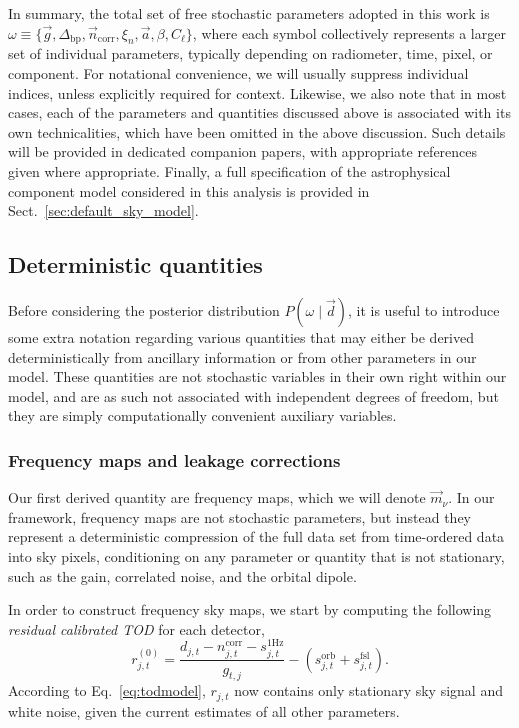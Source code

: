 \documentclass[onecolumn]{aa}
\renewcommand{\d}[0]{\vec{d}}
\newcommand{\n}[0]{\vec{n}}
\renewcommand{\a}[0]{\vec{a}}
\newcommand{\m}[0]{\vec{m}}
\newcommand{\g}[0]{\vec{g}}
\newcommand{\Dbp}[0]{\Delta_{\mathrm{bp}}}
\begin{document}
In summary, the total set of free stochastic parameters adopted in
this work is
$\omega\equiv\{\g,\Dbp,\n_{\mathrm{corr}},\xi_{n},\a,\beta,C_{\ell}\}$,
where each symbol collectively represents a larger set of individual
parameters, typically depending on radiometer, time, pixel, or
component. For notational convenience, we will usually suppress
individual indices, unless explicitly required for context. Likewise,
we also note that in most cases, each of the parameters and quantities
discussed above is associated with its own technicalities, which have
been omitted in the above discussion. Such details will be provided in
dedicated companion papers, with appropriate references given where
appropriate. Finally, a full specification of the astrophysical
component model considered in this analysis is provided in
Sect.~\ref{sec:default_sky_model}.

\subsection{Deterministic quantities}
\label{sec:derquant}

Before considering the posterior distribution $P(\omega\mid \d)$, it is
useful to introduce some extra notation regarding various quantities
that may either be derived deterministically from ancillary
information or from other parameters in our model. These quantities
are not stochastic variables in their own right within our model, and
are as such not associated with independent degrees of freedom, but
they are simply computationally convenient auxiliary variables.

\subsubsection{Frequency maps and leakage corrections}
\label{sec:freqmaps}

Our first derived quantity are frequency maps, which we
will denote $\m_{\nu}$. In our framework, frequency maps are not
stochastic parameters, but instead they represent a deterministic
compression of the full data set from time-ordered data into sky
pixels, conditioning on any parameter or quantity that is not
stationary, such as the gain, correlated noise, and the orbital
dipole.

In order to construct frequency sky maps, we start by computing the
following \emph{residual calibrated TOD} for each detector,
\begin{equation}
  r^{(0)}_{j,t} = \frac{d_{j,t}- n^{\mathrm{corr}}_{j,t}- s^{\mathrm{1Hz}}_{j,t}}{g_{t,j}} - \left(s^{\mathrm{orb}}_{j,t}  
  + s^{\mathrm{fsl}}_{j,t}\right).
  \label{eq:res_bin1}
\end{equation}
According to Eq.~\eqref{eq:todmodel}, $r_{j,t}$ now contains only
stationary sky signal and white noise, given the current estimates of
all other parameters.
\end{document}
